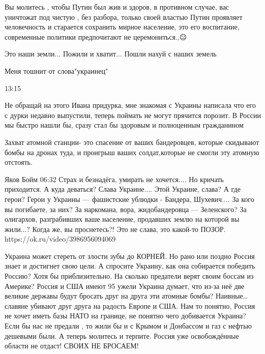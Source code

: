 
Вы молитесь , чтобы Путин был жив и здоров, в противном случае, вас уничтожат
под чистую , без разбора, только своей властью Путин проявляет человечность и
старается сохранить мирное население, это его воспитание, современные политики
предпочитают не церемониться.,😐


Это наши земли... Пожили и хватит... Пошли нахуй с наших земель


Меня тошнит от слова"украинец"

13:15

Не обращай на этого Ивана придурка, мне знакомая с Украины написала что его с
дурки недавно выпустили, теперь поймать не могут прячится порозит. В России мы
быстро нашли бы, сразу стал бы здоровым и полноценным гражданином


Захват атомной станции- это спасение от ваших бандеровцев, которые скидывают
бомбы на дронах туда, и проигрыш ваших солдат,которые не смогли эту атомную
отстоять.

Яков Бойм
06:32
Страх и безнадёга, умирать не хочется....
Но кричать приходится.
А куда деваться?
Слава Украине....
Этой Украине, слава?
А где герои?
Герои у Украины — фашистские ублюдки - Бандера, Шухевич....
За кого вы погибаете, за них?
За наркомана, вора, жидобандеровца — Зеленского?
За олигархов, разграбивших ваше население, продавших землю на которой вы жили...?
Когда же, вы проснетесь?!
Это не слава, это какой-то ПОЗОР.
https://ok.ru/video/3986956094069


Украина может стереть от злости зубы до КОРНЕЙ. Но рано или поздно Россия знает
и достигнет свою цели. А спросите Украину, как она собирается победить Россию?
Хотя бы приблизительно. На сколько предатели верят своим боссам из Америке?
Россия и США имеют 95%
ужели Украина думает, что из-за неё две великие державы будут бросать друг на
друга эти атомные бомбы? Наивные… славяне убивают друг друга на радость Европе
и США. Нам то понятно, Россия не хочет иметь базы НАТО на границе, не понятно
чего добивается Украина? Если бы нас не предали , то жили бы и с Крымом и
Донбассом и газ с нефтью дешевыми были. А теперь молитесь и терпите. Россия уже
освобождённые области не отдаст! СВОИХ НЕ БРОСАЕМ!

